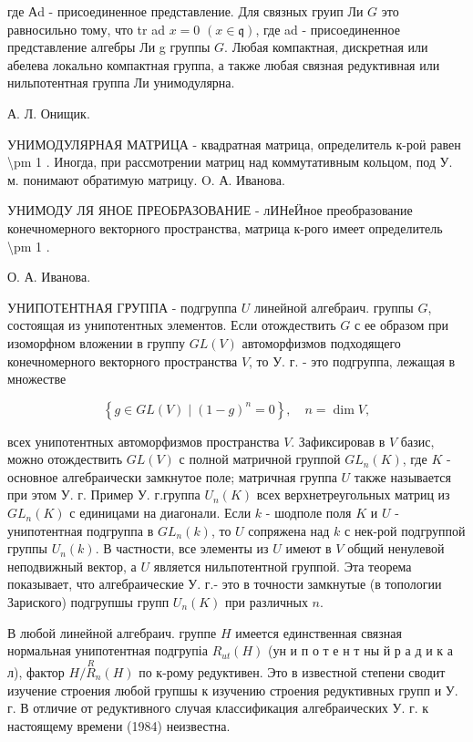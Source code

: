 \documentclass[10pt]{article}
\begin{document}
где Аd - присоединенное представление. Для связных груип Ли $G$ это равносильно тому, что tr ad $x=0$ $(x \in \mathfrak{q})$, где ad - присоединенное представление алгебры Ли g группы $G$. Любая компактная, дискретная или абелева локально компактная группа, а также любая связная редуктивная или нильпотентная группа Ли унимодулярна.



А. Л. Онищик.



УНИМОДУЛЯРНАЯ МАТРИЦА - квадратная матрица, определитель к-роӥ равен \textbackslash pm 1 . Иногда, при рассмотрении матриц над коммутативным кольцом, под У. м. понимают обратимую матрицу. O. А. Иванова.



УНИМОДУ ЛЯ ЯНОЕ ПРЕОБРАЗОВАНИЕ - лИНеӤное преобразование конечномерного векторного пространства, матрица к-рого имеет определитель \textbackslash pm 1 .



О. А. Иванова.



УНИПОТЕНТНАЯ ГРУППА - подгруппа $U$ линейной алгебраич. группы $G$, состоящая из унипотентных элементов. Если отождествить $G$ с ее образом при изоморфном вложении в группу $G L(V)$ автоморфизмов подходящего конечномерного векторного пространства $V$, то У. г. - это подгруппа, лежащая в множестве



\[

\left\{g \in G L(V) \mid(1-g)^{n}=0\right\}, \quad n=\operatorname{dim} V,

\]



всех унипотентных автоморфизмов пространства $V$. Зафиксировав в $V$ базис, можно отождествить $G L(V)$ с полной матричной группой $G L_{n}(K)$, где $K$ - основное алгебраически замкнутое поле; матричная группа $U$ также называется при этом У. г. Пример У. г.группа $U_{n}(K)$ всех верхнетреугольных матриц из $G L_{n}(K)$ с единицами на диагонали. Если $k$ - шодполе поля $K$ и $U$ - унипотентная подгруппа в $G L_{n}(k)$, то $U$ сопряжена над $k$ с нек-рой подгруппой группы $U_{n}(k)$. В частности, все элементы из $U$ имеют в $V$ общий ненулевой неподвижный вектор, а $U$ является нильпотентной группой. Эта теорема показывает, что алгебраические У. г.- это в точности замкнутые (в топологии Зариского) подгрупшы групп $U_{n}(K)$ при различных $n$.



В любой линейной алгебраич. группе $H$ имеется единственная связная нормальная унипотентная подгрупіа $R_{u t}(H)$ (ун и п о т е н т ны й р а д и к а л), фактор $H / \stackrel{R}{R}_{n}(H)$ по к-рому редуктивен. Это в известной степени сводит изучение строения любой групшы к изучению строения редуктивных групп и У. г. В отличие от редуктивного случая классификация алгебраических У. г. к настоящему времени (1984) неизвестна.
\end{document}
